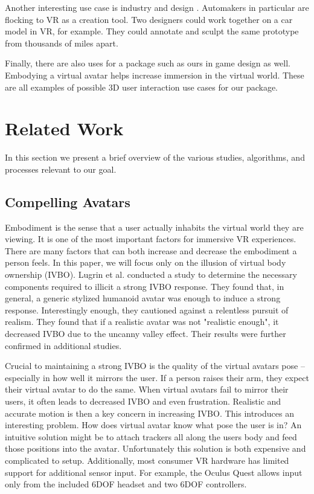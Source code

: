 \documentclass{vgtc}                          %
\begin{document}
    Another interesting use case is industry and design \cite{Distributed}. Automakers in particular are flocking to VR as a creation tool. Two designers could work together on a car model in VR, for example. They could annotate and sculpt the same prototype from thousands of miles apart.
    
    Finally, there are also uses for a package such as ours in game design as well. Embodying a virtual avatar helps increase immersion in the virtual world. These are all examples of possible 3D user interaction use cases for our package.
    
\section{Related Work}

    In this section we present a brief overview of the various studies, algorithms, and processes relevant to our goal.

\subsection{Compelling Avatars}

    Embodiment is the sense that a user actually inhabits the virtual world they are viewing. It is one of the most important factors for immersive VR experiences. There are many factors that can both increase and decrease the embodiment a person feels. In this paper, we will focus only on the illusion of virtual body ownership (IVBO). Lugrin et al. \cite{Avatar} conducted a study to determine the necessary components required to illicit a strong IVBO response. They found that, in general, a generic stylized humanoid avatar was enough to induce a strong response. Interestingly enough, they cautioned against a relentless pursuit of realism. They found that if a realistic avatar was not "realistic enough", it decreased IVBO due to the uncanny valley effect. Their results were further confirmed in additional studies\cite{Influence}.
    
    Crucial to maintaining a strong IVBO is the quality of the virtual avatars pose – especially in how well it mirrors the user. If a person raises their arm, they expect their virtual avatar to do the same. When virtual avatars fail to mirror their users, it often leads to decreased IVBO and even frustration. Realistic and accurate motion is then a key concern in increasing IVBO. This introduces an interesting problem. How does virtual avatar know what pose the user is in? An intuitive solution might be to attach trackers all along the users body and feed those positions into the avatar. Unfortunately this solution is both expensive and complicated to setup. Additionally, most consumer VR hardware has limited support for additional sensor input. For example, the Oculus Quest allows input only from the included 6DOF headset and two 6DOF controllers.
\end{document}
